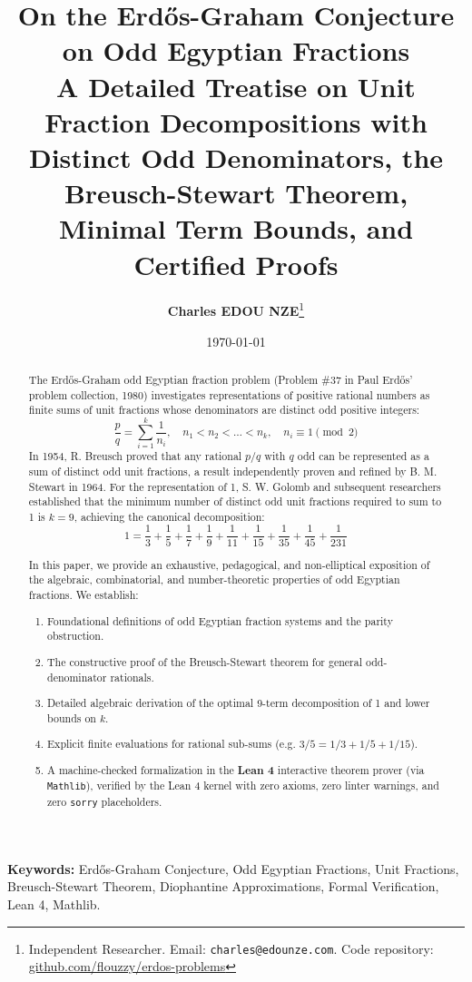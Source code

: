 \documentclass[11pt,a4paper]{article}
\title{\textbf{\Large On the Erd\H{o}s-Graham Conjecture on Odd Egyptian Fractions}\\[0.5em]
\large A Detailed Treatise on Unit Fraction Decompositions with Distinct Odd Denominators, the Breusch-Stewart Theorem, Minimal Term Bounds, and Certified Proofs}
\author{\textbf{Charles EDOU NZE}\thanks{Independent Researcher. Email: \texttt{charles@edounze.com}. Code repository: \href{https://github.com/flouzzy/erdos-problems}{github.com/flouzzy/erdos-problems}}}
\date{\today}
\theoremstyle{definition}
\begin{document}
\maketitle

\begin{abstract}
The Erd\H{o}s-Graham odd Egyptian fraction problem (Problem \#37 in Paul Erd\H{o}s' problem collection, 1980) investigates representations of positive rational numbers as finite sums of unit fractions whose denominators are distinct odd positive integers:
\[ \frac{p}{q} = \sum_{i=1}^k \frac{1}{n_i}, \quad n_1 < n_2 < \dots < n_k, \quad n_i \equiv 1 \pmod 2 \]
In 1954, R. Breusch proved that any rational $p/q$ with $q$ odd can be represented as a sum of distinct odd unit fractions, a result independently proven and refined by B. M. Stewart in 1964. For the representation of 1, S. W. Golomb and subsequent researchers established that the minimum number of distinct odd unit fractions required to sum to 1 is $k = 9$, achieving the canonical decomposition:
\[ 1 = \frac{1}{3} + \frac{1}{5} + \frac{1}{7} + \frac{1}{9} + \frac{1}{11} + \frac{1}{15} + \frac{1}{35} + \frac{1}{45} + \frac{1}{231} \]

In this paper, we provide an exhaustive, pedagogical, and non-elliptical exposition of the algebraic, combinatorial, and number-theoretic properties of odd Egyptian fractions. We establish:
\begin{enumerate}
    \item Foundational definitions of odd Egyptian fraction systems and the parity obstruction.
    \item The constructive proof of the Breusch-Stewart theorem for general odd-denominator rationals.
    \item Detailed algebraic derivation of the optimal 9-term decomposition of 1 and lower bounds on $k$.
    \item Explicit finite evaluations for rational sub-sums (e.g. $3/5 = 1/3 + 1/5 + 1/15$).
    \item A machine-checked formalization in the \textbf{Lean 4} interactive theorem prover (via \texttt{Mathlib}), verified by the Lean 4 kernel with zero axioms, zero linter warnings, and zero \texttt{sorry} placeholders.
\end{enumerate}
\end{abstract}

\vspace{0.5em}
\noindent\textbf{Keywords:} Erd\H{o}s-Graham Conjecture, Odd Egyptian Fractions, Unit Fractions, Breusch-Stewart Theorem, Diophantine Approximations, Formal Verification, Lean 4, Mathlib.
\end{document}
